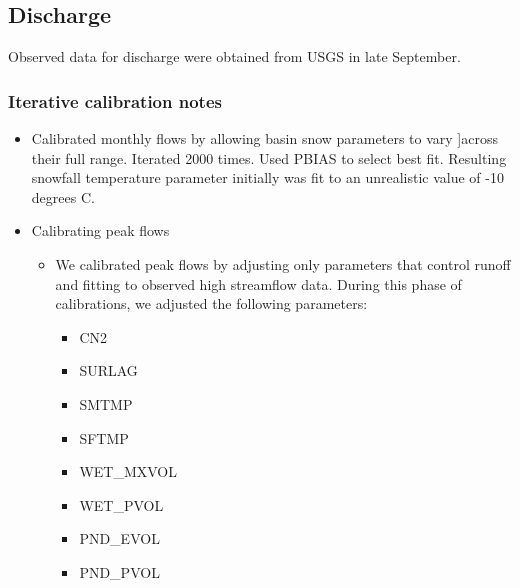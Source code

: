 \subsection{Discharge}
Observed data for discharge were obtained from USGS in late September.

\subsubsection{Iterative calibration notes}
\begin{itemize}
    \item Calibrated monthly flows by allowing basin snow parameters to vary
    ]across their full range. Iterated 2000 times. Used PBIAS to select best
    fit.
    Resulting snowfall temperature parameter initially was fit to an unrealistic
    value of -10 degrees C.
    \item Calibrating peak flows
    \begin{itemize}
        \item We calibrated peak flows by adjusting only parameters that control
        runoff and fitting to observed high streamflow data. During this phase of
        calibrations, we adjusted the following parameters:
        \begin{itemize}
            \item CN2
            \item SURLAG
            \item SMTMP
            \item SFTMP
            \item WET_MXVOL
            \item WET_PVOL
            \item PND_EVOL
            \item PND_PVOL
        \end{itemize}
    \end{itemize}
\end{itemize}
\pagebreak
